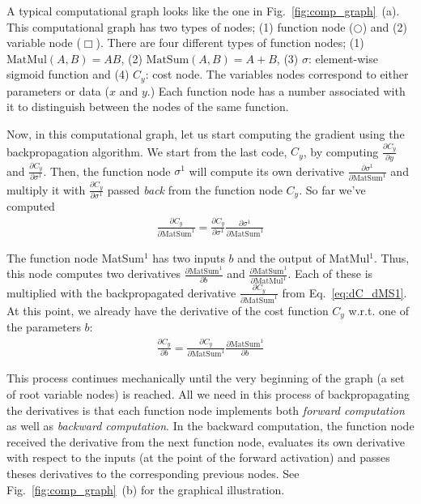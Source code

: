 \documentclass{report}
\begin{document}
A typical computational graph looks like the one in Fig.~\ref{fig:comp_graph}~(a).
This computational graph has two types of nodes; (1) function node ($\bigcirc$)
and (2) variable node ($\Box$). There are four different types of function
nodes; (1) $\text{MatMul}(A,B) = AB$, (2) $\text{MatSum}(A,B)=A+B$, (3)
$\sigma$: element-wise sigmoid function  and (4) $C_y$: cost node. The variables
nodes correspond to either parameters or data ($x$ and $y$.) Each function node
has a number associated with it to distinguish between the nodes of the same
function.

Now, in this computational graph, let us start computing the gradient using the
backpropagation algorithm. We start from the last code, $C_y$, by computing
$\frac{\partial C_y}{\partial y}$ and $\frac{\partial C_y}{\partial \sigma^1}$.
Then, the function node $\sigma^1$ will compute its own derivative
$\frac{\partial \sigma^1}{\partial \text{MatSum}^1}$ and multiply it with
$\frac{\partial C_y}{\partial \sigma^1}$ passed {\em back} from the function
node $C_y$. So far we've computed
\begin{align}
    \label{eq:dC_dMS1}
    \frac{\partial C_y}{\partial \text{MatSum}^1} = \frac{\partial C_y}{\partial \sigma^1} \frac{\partial \sigma^1}{\partial
    \text{MatSum}^1}
\end{align}

The function node MatSum$^1$ has two inputs $b$ and the output of MatMul$^1$.
Thus, this node computes two derivatives $\frac{\partial
\text{MatSum}^1}{\partial b}$ and $\frac{\partial \text{MatSum}^1}{\partial
\text{MatMul}^1}$. Each of these is multiplied with the backpropagated
derivative $\frac{\partial C_y}{\partial \text{MatSum}^1}$ from
Eq.~\eqref{eq:dC_dMS1}. At this point, we already have the derivative of the
cost function $C_y$ w.r.t. one of the parameters $b$:
\begin{align*}
    \frac{\partial C_y}{\partial b} = \frac{\partial C_y}{\partial
    \text{MatSum}^1} \frac{\partial \text{MatSum}^1}{\partial b}
\end{align*}

This process continues mechanically until the very beginning of the graph (a set
of root variable nodes) is reached. All we need in this process of
backpropagating the derivatives is that each function node implements both {\em
forward computation} as well as {\em backward computation}. In the backward
computation, the function node received the derivative from the next function
node, evaluates its own derivative with respect to the inputs (at the point of
the forward activation) and passes theses
derivatives to the corresponding previous nodes. See
Fig.~\ref{fig:comp_graph}~(b) for the graphical illustration.
\end{document}
